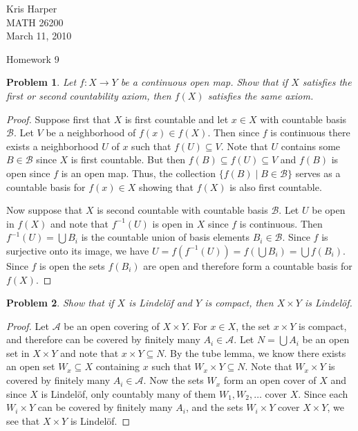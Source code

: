 \documentclass{article}
\newtheorem{problem}{Problem}
\begin{document}
\begin{flushright}
Kris Harper\\

MATH 26200\\

March 11, 2010
\end{flushright}

\begin{center}
Homework 9
\end{center}

\begin{problem}
Let $f : X \to Y$ be a continuous open map. Show that if $X$ satisfies the first or second countability axiom, then $f(X)$ satisfies the same axiom.
\end{problem}
\begin{proof}
Suppose first that $X$ is first countable and let $x \in X$ with countable basis $\mathcal{B}$. Let $V$ be a neighborhood of $f(x) \in f(X)$. Then since $f$ is continuous there exists a neighborhood $U$ of $x$ such that $f(U) \subseteq V$. Note that $U$ contains some $B \in \mathcal{B}$ since $X$ is first countable. But then $f(B) \subseteq f(U) \subseteq V$ and $f(B)$ is open since $f$ is an open map. Thus, the collection $\{f(B) \mid B \in \mathcal{B}\}$ serves as a countable basis for $f(x) \in X$ showing that $f(X)$ is also first countable.

Now suppose that $X$ is second countable with countable basis $\mathcal{B}$. Let $U$ be open in $f(X)$ and note that $f^{-1}(U)$ is open in $X$ since $f$ is continuous. Then $f^{-1}(U) = \bigcup B_i$ is the countable union of basis elements $B_i \in \mathcal{B}$. Since $f$ is surjective onto its image, we have $U = f(f^{-1}(U)) = f \left ( \bigcup B_i \right ) = \bigcup f(B_i)$. Since $f$ is open the sets $f(B_i)$ are open and therefore form a countable basis for $f(X)$.
\end{proof}

\begin{problem}
Show that if $X$ is Lindel\"{o}f and $Y$ is compact, then $X \times Y$ is Lindel\"{o}f.
\end{problem}
\begin{proof}
Let $\mathcal{A}$ be an open covering of $X \times Y$. For $x \in X$, the set $x \times Y$ is compact, and therefore can be covered by finitely many $A_i \in \mathcal{A}$. Let $N = \bigcup A_i$ be an open set in $X \times Y$ and note that $x \times Y \subseteq N$. By the tube lemma, we know there exists an open set $W_x \subseteq X$ containing $x$ such that $W_x \times Y \subseteq N$. Note that $W_x \times Y$ is covered by finitely many $A_i \in \mathcal{A}$. Now the sets $W_x$ form an open cover of $X$ and since $X$ is Lindel\"{o}f, only countably many of them $W_1, W_2, \dots$ cover $X$. Since each $W_i \times Y$ can be covered by finitely many $A_i$, and the sets $W_i \times Y$ cover $X \times Y$, we see that $X \times Y$ is Lindel\"{o}f.
\end{proof}
\end{document}
